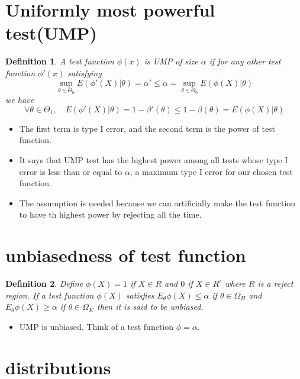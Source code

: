 \documentclass[11pt,reqno]{amsart}
\newtheorem{definition}{Definition}
\theoremstyle{remark}
\begin{document}
\section{Uniformly most powerful test(UMP)}
\begin{definition}
A test function $\phi(x)$ is UMP of size $\alpha$ if for any other test function $\phi'(x)$ satisfying 
$$
\sup_{\theta\in \Theta_0} E(\phi'(X)\lvert \theta)=\alpha'\leq \alpha=\sup_{\theta\in\Theta_0}E(\phi(X)\lvert \theta)
$$
we have
$$
\forall \theta\in\Theta_1,\quad E(\phi'(X)\lvert \theta)=1-\beta'(\theta)\leq 1-\beta(\theta)=E(\phi(X)\lvert \theta)
$$
\end{definition}
\begin{itemize}
\item The first term is type I error, and the second term is the power of test function.
\item It says that UMP test has the highest power among all tests whose type I error is less than or equal to $\alpha$, a maximum type I error for our chosen test function.
\item The assumption is needed because we can artificially make the test function to have th highest power by rejecting all the time.
\end{itemize}

\section{unbiasedness of test function}
\begin{definition}
Define $\phi(X)=1$ if $X\in R$ and $0$ if $X\in R^c$ where $R$ is a reject region. If a test function $\phi(X)$ satisfies $E_\theta \phi(X)\leq \alpha$ if 
$\theta\in\Omega_H$ and $E_\theta \phi(X)\geq\alpha$ if $\theta\in\Omega_K$ then it is said to be unbiased.
\end{definition}
\begin{itemize}
\item UMP is unbiased. Think of a test function $\phi=\alpha$.
\end{itemize}

\section{distributions}
\end{document}
